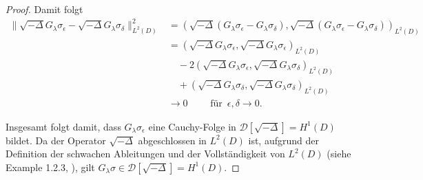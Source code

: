 \documentclass[10pt, a4paper, leqno, twoside, bibliography=totocnumbered, final]{scrartcl}
\theoremstyle{definition}
\theoremstyle{plain}%
\theoremstyle{remark}
\begin{document}
\begin{proof}
Damit folgt
\begin{align*}
\| \sqrt{- \Delta} G_{\lambda} \sigma_{\epsilon} - \sqrt{- \Delta} G_{\lambda} \sigma_{\delta} \|^2_{L^2(D)} & = (\sqrt{- \Delta} (G_{\lambda} \sigma_{\epsilon} - G_{\lambda} \sigma_{\delta}), \sqrt{- \Delta} (G_{\lambda} \sigma_{\epsilon} - G_{\lambda} \sigma_{\delta}))_{L^2(D)} \\
& = (\sqrt{- \Delta} G_{\lambda} \sigma_{\epsilon}, \sqrt{- \Delta} G_{\lambda} \sigma_{\epsilon})_{L^2(D)} \\
& \quad - 2 (\sqrt{- \Delta} G_{\lambda} \sigma_{\epsilon}, \sqrt{- \Delta} G_{\lambda} \sigma_{\delta})_{L^2(D)} \\
& \quad + (\sqrt{- \Delta} G_{\lambda} \sigma_{\delta}, \sqrt{- \Delta} G_{\lambda} \sigma_{\delta})_{L^2(D)} \\
& \to 0 \qquad \text{ für } \, \epsilon, \delta \to 0.
\end{align*}

Insgesamt folgt damit, dass $  G_{\lambda} \sigma_{\epsilon} $ eine Cauchy-Folge in $ \mathcal{D}[\sqrt{-\Delta}] = H^1(D) $ bildet. Da der Operator $ \sqrt{- \Delta} $ abgeschlossen in $L^2(D)$ ist, aufgrund der Definition der schwachen Ableitungen und der Vollständigkeit von $L^2(D)$ (siehe Example 1.2.3, \cite{Fukushima}), gilt $ G_{\lambda} \sigma \in \mathcal{D}[\sqrt{-\Delta}] = H^1(D) $.



\end{proof}
\end{document}
